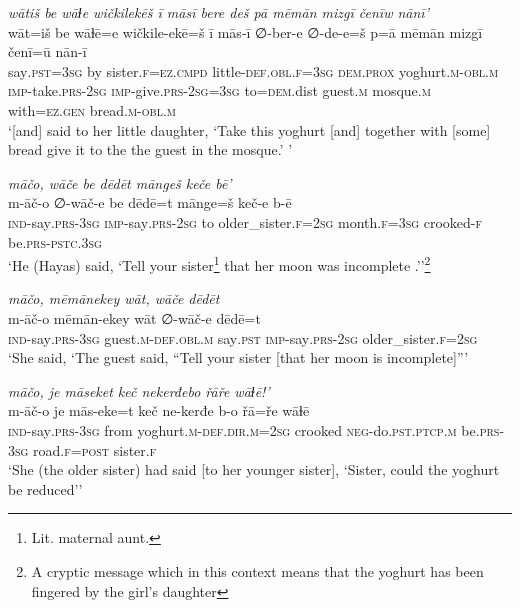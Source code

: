 \ea \label{ŽH.40}
\textit{wātiš be wāɫe wičkilekēš ī māsī bere deš pā mēmān mizgī čenīw nānī’} \\ 
\gll wāt=iš be wāɫē=e wičkile-ekē=š ī mās-ī ∅-ber-e ∅-de-e=š p=ā mēmān mizgī čenī=ū nān-ī \\ 
 say\textsc{.pst}\textsc{=3sg} by sister\textsc{\textsc{.f}}\textsc{=ez}\textsc{.cmpd} little\textsc{-def}\textsc{.obl}\textsc{\textsc{.f}}\textsc{=3sg} \textsc{dem.prox} yoghurt\textsc{.m}\textsc{-obl}\textsc{.m} \textsc{imp-}take\textsc{.prs}-\textsc{2sg} \textsc{imp-}give\textsc{.prs}-\textsc{2sg}\textsc{=3sg} to\textsc{=dem}.dist guest\textsc{.m} mosque\textsc{.m} with\textsc{=ez}\textsc{.gen} bread\textsc{.m}\textsc{-obl}\textsc{.m} \\ 
\glt `[and] said to her little daughter, ‘Take this yoghurt [and] together with [some] bread give it to the the guest in the mosque.’ '
\z 
 
\ea \label{ŽH.45}
\textit{māčo, wāče be dēdēt māngeš keče bē’} \\ 
\gll m-āč-o ∅-wāč-e be dēdē=t mānge=š keč-e b-ē \\ 
 \textsc{ind-}say\textsc{.prs}\textsc{-3sg} \textsc{imp-}say\textsc{.prs-}\textsc{2sg} to older\_sister\textsc{\textsc{.f}}\textsc{=\textsc{2sg}} month\textsc{\textsc{.f}}\textsc{=3sg} crooked\textsc{-f} be\textsc{.prs}\textsc{-pstc}\textsc{.3sg} \\ 
\glt `He (Hayas) said, ‘Tell your sister\footnote{Lit. maternal aunt.} that her moon was incomplete .’'\footnote{A cryptic message which in this context means that the yoghurt has been fingered by the girl’s daughter}
\z 
 
\ea \label{ŽH.47}
\textit{māčo, mēmānekey wāt, wāče dēdēt} \\ 
\gll m-āč-o mēmān-ekey wāt ∅-wāč-e dēdē=t \\ 
 \textsc{ind-}say\textsc{.prs}\textsc{-3sg} guest\textsc{.m}\textsc{-def}\textsc{.obl}\textsc{.m} say\textsc{.pst} \textsc{imp-}say\textsc{.prs-}\textsc{2sg} older\_sister\textsc{\textsc{.f}}\textsc{=\textsc{2sg}} \\ 
\glt `She said, ‘The guest said, “Tell your sister [that her moon is incomplete]”'
\z 
 
\ea \label{ŽH.48}
\textit{māčo, je māseket keč nekerđebo řāře wāɫē!’} \\ 
\gll m-āč-o je mās-eke=t keč ne-kerđe b-o řā=ře wāɫē \\ 
 \textsc{ind-}say\textsc{.prs}\textsc{-3sg} from yoghurt\textsc{.m}\textsc{-def}\textsc{.dir}\textsc{.m}\textsc{=\textsc{2sg}} crooked \textsc{neg-}do\textsc{.pst}\textsc{.ptcp}\textsc{.m} be\textsc{.prs}\textsc{-3sg} road\textsc{\textsc{.f}}\textsc{=\textsc{post}} sister\textsc{\textsc{.f}} \\ 
\glt `She (the older sister) had said [to her younger sister], ‘Sister, could the yoghurt be reduced’'
\z 
 
